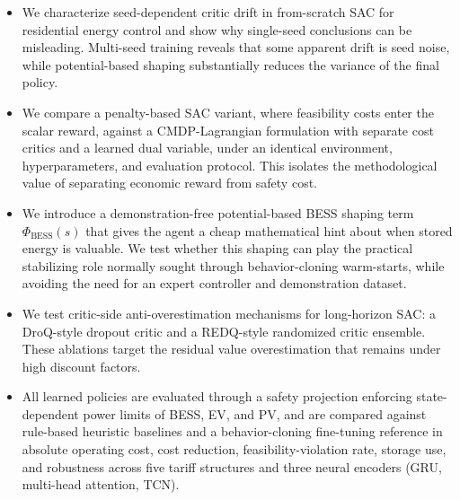 \documentclass[preprint,12pt, 3p]{elsarticle}
\begin{document}
\begin{itemize}
    \item We characterize seed-dependent critic drift in from-scratch \gls{SAC} for residential energy control and show why single-seed conclusions can be misleading. Multi-seed training reveals that some apparent drift is seed noise, while potential-based shaping substantially reduces the variance of the final policy.

    \item We compare a penalty-based \gls{SAC} variant, where feasibility costs enter the scalar reward, against a \gls{CMDP}-Lagrangian formulation with separate cost critics and a learned dual variable, under an identical environment, hyperparameters, and evaluation protocol. This isolates the methodological value of separating economic reward from safety cost.

    \item We introduce a demonstration-free potential-based \gls{BESS} shaping term $\Phi_{\mathrm{BESS}}(s)$ that gives the agent a cheap mathematical hint about when stored energy is valuable. We test whether this shaping can play the practical stabilizing role normally sought through behavior-cloning warm-starts, while avoiding the need for an expert controller and demonstration dataset.

    \item We test critic-side anti-overestimation mechanisms for long-horizon \gls{SAC}: a DroQ-style dropout critic and a REDQ-style randomized critic ensemble. These ablations target the residual value overestimation that remains under high discount factors.

    \item All learned policies are evaluated through a safety projection enforcing state-dependent power limits of \gls{BESS}, \gls{EV}, and \gls{PV}, and are compared against rule-based heuristic baselines and a behavior-cloning fine-tuning reference in absolute operating cost, cost reduction, feasibility-violation rate, storage use, and robustness across five tariff structures and three neural encoders (\gls{GRU}, multi-head attention, \gls{TCN}).
\end{itemize}

\end{document}
